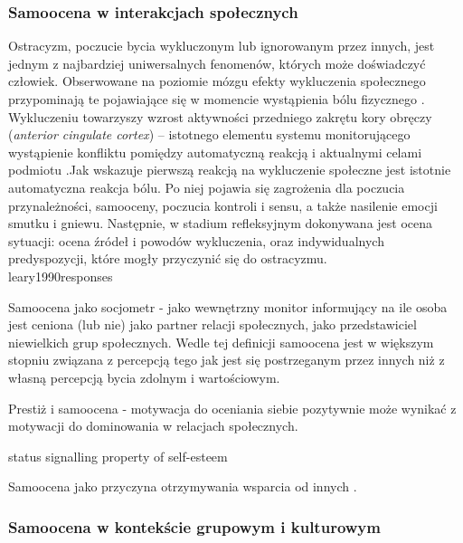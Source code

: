 \documentclass[man]{apa6}
\begin{document}
\subsubsection{Samoocena w interakcjach społecznych}

Ostracyzm, poczucie bycia wykluczonym lub ignorowanym przez innych, jest jednym z najbardziej uniwersalnych fenomenów, których może doświadczyć człowiek. Obserwowane na poziomie mózgu efekty wykluczenia społecznego przypominają te pojawiające się w momencie wystąpienia bólu fizycznego \parencite{eisenberger2003does}. Wykluczeniu towarzyszy wzrost aktywności przedniego zakrętu kory obręczy (\emph{anterior cingulate cortex}) -- istotnego elementu systemu monitorującego wystąpienie konfliktu pomiędzy automatyczną reakcją i aktualnymi celami podmiotu \parencite{bush2000cognitive}.Jak wskazuje \textcite{williams2007ostracism} pierwszą reakcją na wykluczenie społeczne jest istotnie automatyczna reakcja bólu. Po niej pojawia się zagrożenia dla poczucia przynależności, samooceny, poczucia kontroli i sensu, a także nasilenie emocji smutku i gniewu. Następnie, w stadium refleksyjnym dokonywana jest ocena sytuacji: ocena źródeł i powodów wykluczenia, oraz indywidualnych predyspozycji, które mogły przyczynić się do ostracyzmu.\\

leary1990responses

Samoocena jako socjometr \parencite{leary1995self, leary2000nature} - jako wewnętrzny monitor informujący na ile osoba jest ceniona (lub nie) jako partner relacji społecznych, jako przedstawiciel niewielkich grup społecznych. Wedle tej definicji samoocena jest w większym stopniu związana z percepcją tego jak jest się postrzeganym przez innych niż z własną percepcją bycia zdolnym i wartościowym.

Prestiż i samoocena \parencite{barkow1980prestige} - motywacja do oceniania siebie pozytywnie może wynikać z motywacji do dominowania w relacjach społecznych.

\parencite{zeigler2013status} status signalling property of self-esteem

Samoocena jako przyczyna otrzymywania wsparcia od innych \parencite{marshall2014self}.


\subsubsection{Samoocena w kontekście grupowym i kulturowym}
\end{document}
